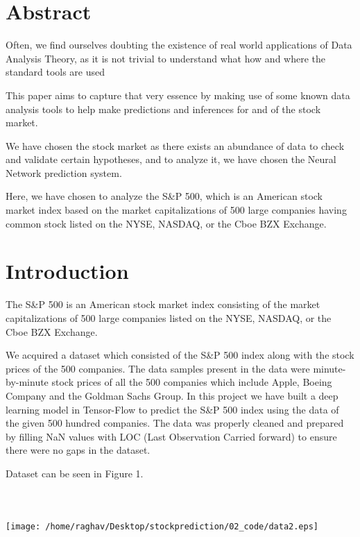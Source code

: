 \documentclass[12pt]{report}
\begin{document}
\section{Abstract}
 
 Often, we find ourselves doubting the existence of real world applications of Data Analysis Theory, as it is not trivial to understand what how and where the standard tools are used 
 
 This paper aims to capture that very essence by making use of some known data analysis tools to help make predictions and inferences for and of the stock market.
 
 We have chosen the stock market as there exists an abundance of data to check and validate certain hypotheses, and to analyze it, we have chosen the Neural Network prediction system.

Here, we have chosen to analyze the S\&P 500, which is an American stock market index based on the market capitalizations of 500 large companies having common stock listed on the NYSE, NASDAQ, or the Cboe BZX Exchange.


\newpage
\section{Introduction}
The S\&P 500 is an American stock market index consisting of the market capitalizations of 500 large companies listed on the NYSE, NASDAQ, or the Cboe BZX Exchange.

We acquired a dataset which consisted of the S\&P 500 index along with the stock prices of the 500 companies. The data samples present in the data were minute-by-minute stock prices of all the 500 companies which include Apple, Boeing Company and the Goldman Sachs Group. In this project we have built a deep learning model in Tensor-Flow to predict the S\&P 500 index using the data of the given 500 hundred companies.  
The data was properly cleaned and prepared by filling NaN values with LOC (Last Observation Carried forward) to ensure there were no gaps in the dataset.

Dataset can be seen in Figure 1.
\\ \\ \\ \\ 
\begin{adjustbox}{center,caption={First 5 rows and 6 columns of the dataset},label={somelabel},nofloat=figure,vspace=\bigskipamount}
\texttt{[image: /home/raghav/Desktop/stockprediction/02\_code/data2.eps]}%
\end{adjustbox}
\end{document}
